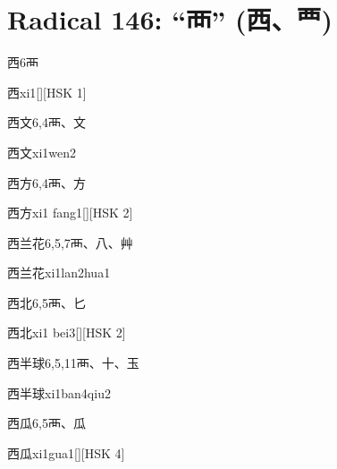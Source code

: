 
\section*{Radical 146: ``⾑'' (西、覀)}

\begin{entry}{西}{6}{⾑}
  \begin{phonetics}{西}{xi1}[][HSK 1]
  \end{phonetics}
\end{entry}

\begin{entry}{西文}{6,4}{⾑、⽂}
  \begin{phonetics}{西文}{xi1wen2}
  \end{phonetics}
\end{entry}

\begin{entry}{西方}{6,4}{⾑、⽅}
  \begin{phonetics}{西方}{xi1 fang1}[][HSK 2]
  \end{phonetics}
\end{entry}

\begin{entry}{西兰花}{6,5,7}{⾑、⼋、⾋}
  \begin{phonetics}{西兰花}{xi1lan2hua1}
  \end{phonetics}
\end{entry}

\begin{entry}{西北}{6,5}{⾑、⼔}
  \begin{phonetics}{西北}{xi1 bei3}[][HSK 2]
  \end{phonetics}
\end{entry}

\begin{entry}{西半球}{6,5,11}{⾑、⼗、⽟}
  \begin{phonetics}{西半球}{xi1ban4qiu2}
  \end{phonetics}
\end{entry}

\begin{entry}{西瓜}{6,5}{⾑、⽠}
  \begin{phonetics}{西瓜}{xi1gua1}[][HSK 4]
  \end{phonetics}
\end{entry}

